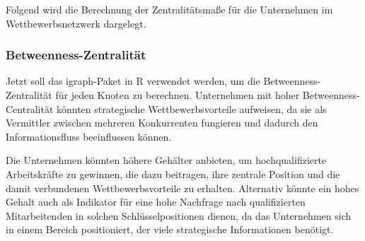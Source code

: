 \documentclass[
]{article}
\newenvironment{Shaded}{\begin{snugshade}}{\end{snugshade}}
\newcommand{\CommentTok}[1]{\textcolor[rgb]{0.56,0.35,0.01}{\textit{#1}}}
\newcommand{\FunctionTok}[1]{\textcolor[rgb]{0.13,0.29,0.53}{\textbf{#1}}}
\newcommand{\NormalTok}[1]{#1}
\newcommand{\OtherTok}[1]{\textcolor[rgb]{0.56,0.35,0.01}{#1}}
\newcommand{\SpecialCharTok}[1]{\textcolor[rgb]{0.81,0.36,0.00}{\textbf{#1}}}
\begin{document}
Folgend wird die Berechnung der Zentralitätsmaße für die Unternehmen im
Wettbewerbsnetzwerk dargelegt.

\begin{Shaded}
\end{Shaded}

\subsubsection{Betweenness-Zentralität}\label{betweenness-zentralituxe4t}

Jetzt soll das igraph-Paket in R verwendet werden, um die
Betweenness-Zentralität für jeden Knoten zu berechnen. Unternehmen mit
hoher Betweenness-Centralität könnten strategische Wettbewerbsvorteile
aufweisen, da sie als Vermittler zwischen mehreren Konkurrenten
fungieren und dadurch den Informationsfluss beeinflussen können.

Die Unternehmen könnten höhere Gehälter anbieten, um hochqualifizierte
Arbeitskräfte zu gewinnen, die dazu beitragen, ihre zentrale Position
und die damit verbundenen Wettbewerbsvorteile zu erhalten. Alternativ
könnte ein hohes Gehalt auch als Indikator für eine hohe Nachfrage nach
qualifizierten Mitarbeitenden in solchen Schlüsselpositionen dienen, da
das Unternehmen sich in einem Bereich positioniert, der viele
strategische Informationen benötigt.
\end{document}
